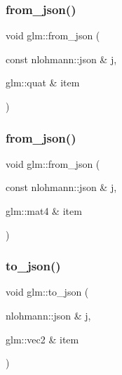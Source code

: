 \subsubsection{\texorpdfstring{from\+\_\+json()}{from\_json()}\hspace{0.1cm}{\footnotesize\ttfamily [4/5]}}
{\footnotesize\ttfamily void glm\+::from\+\_\+json (\begin{DoxyParamCaption}\item[{const nlohmann\+::json \&}]{j,  }\item[{glm\+::quat \&}]{item }\end{DoxyParamCaption})}

\mbox{\label{namespaceglm_aa733090989e1f12ce6a41709b1f74846}} 
\subsubsection{\texorpdfstring{from\+\_\+json()}{from\_json()}\hspace{0.1cm}{\footnotesize\ttfamily [5/5]}}
{\footnotesize\ttfamily void glm\+::from\+\_\+json (\begin{DoxyParamCaption}\item[{const nlohmann\+::json \&}]{j,  }\item[{glm\+::mat4 \&}]{item }\end{DoxyParamCaption})}

\mbox{\label{namespaceglm_a3adb64846afba05672c1976999369158}} 
\subsubsection{\texorpdfstring{to\+\_\+json()}{to\_json()}\hspace{0.1cm}{\footnotesize\ttfamily [1/5]}}
{\footnotesize\ttfamily void glm\+::to\+\_\+json (\begin{DoxyParamCaption}\item[{nlohmann\+::json \&}]{j,  }\item[{glm\+::vec2 \&}]{item }\end{DoxyParamCaption})}

\mbox{\label{namespaceglm_acd19f7adbfdaa852239fba87c641e49d}} 

